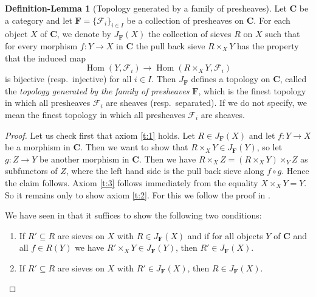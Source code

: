 \documentclass[12pt,reqno,a4paper]{amsart}
\theoremstyle{plain}
\theoremstyle{definition}
\newtheorem{defnlm}[thm]{Definition-Lemma}
\theoremstyle{remark}
\begin{document}
\begin{defnlm}[Topology generated by a family of presheaves]\label{defnlm:generatedtopology}
  Let $\mathbf{C}$ be a category and let $\mathbf{F} = \{ \mathscr{F}_{i} \}_{i \in I}$ be a collection of presheaves on $\mathbf{C}$.
  For each object $X$ of $\mathbf{C}$, we denote by $J_{\mathbf{F}}(X)$ the collection of sieves $R$ on $X$ such that for every morphism $f \colon Y \to X$ in $\mathbf{C}$ the pull back sieve $R \times_{X} Y$ has the property that the induced map
  \[ \operatorname{Hom}(Y,\mathscr{F}_{i}) \to \operatorname{Hom}(R \times_{X} Y, \mathscr{F}_{i}) \]
  is bijective (resp.~injective) for all $i \in I$.
  Then $J_{\mathbf{F}}$ defines a topology on $\mathbf{C}$, called the \textit{topology generated by the family of presheaves} $\mathbf{F}$, which is the finest topology in which all presheaves $\mathscr{F}_{i}$ are sheaves (resp.~separated).
  If we do not specify, we mean the finest topology in which all presheaves $\mathscr{F}_{i}$ are sheaves.
  \begin{proof}
    Let us check first that axiom \ref{t:1} holds.
    Let $R \in J_{\mathbf{F}}(X)$ and let $f \colon Y \to X$ be a morphism in $\mathbf{C}$.
    Then we want to show that $R \times_{X} Y \in J_{\mathbf{F}}(Y)$, so let $g \colon Z \to Y$ be another morphism in $\mathbf{C}$.
    Then we have $R \times_{X} Z = (R \times_{X} Y) \times_{Y} Z$ as subfunctors of $Z$, where the left hand side is the pull back sieve along $f \circ g$.
    Hence the claim follows.
    Axiom \ref{t:3} follows immediately from the equality $X \times_{X} Y = Y$.
    So it remains only to show axiom \ref{t:2}.
    For this we follow the proof in \cite[Exposé II, Proposition 2.2]{sga4}.

    We have seen in  that it suffices to show the following two conditions:
    \begin{enumerate}[label=(T2)$_{\arabic*}$]
      \item If $R' \subseteq R$ are sieves on $X$ with $R \in J_{\mathbf{F}}(X)$ and if for all objects $Y$ of $\mathbf{C}$ and all $f \in R(Y)$ we have $R' \times_{X} Y \in J_{\mathbf{F}}(Y)$, then $R' \in J_{\mathbf{F}}(X)$.
      \item If $R' \subseteq R$ are sieves on $X$ with $R' \in J_{\mathbf{F}}(X)$, then $R \in J_{\mathbf{F}}(X)$.
    \end{enumerate}


\end{proof}
\end{defnlm}
\end{document}
